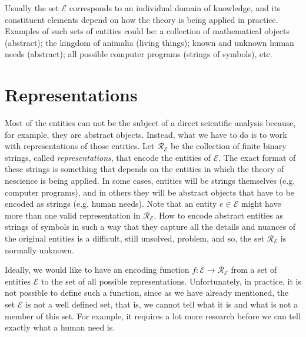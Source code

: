 Usually the set $\mathcal{E}$ corresponds to an individual domain of knowledge, and its constituent elements depend on how the theory is being applied in practice. Examples of such sets of entities could be: a collection of mathematical objects (abstract); the kingdom of animalia (living things); known and unknown human needs (abstract); all possible computer programs (strings of symbols), etc.

%
%

\section{Representations}

Most of the entities can not be the subject of a direct scientific analysis because, for example, they are abstract objects. Instead, what we have to do is to work with representations of those entities. Let $\mathcal{R_\mathcal{E}}$ be the collection of finite binary strings, called \emph{representations}, that encode the entities of $\mathcal{E}$. The exact format of these strings is something that depends on the entities in which the theory of nescience is being applied. In some cases, entities will be strings themselves (e.g. computer programs), and in others they will be abstract objects that have to be encoded as strings (e.g. human needs). Note that an entity $e \in \mathcal{E}$ might have more than one valid representation in $\mathcal{R_\mathcal{E}}$. How to encode abstract entities as strings of symbols in such a way that they capture all the details and nuances of the original entities is a difficult, still unsolved, problem, and so, the set $\mathcal{R_\mathcal{E}}$ is normally unknown. 

Ideally, we would like to have an encoding function $f:\mathcal{E} \rightarrow \mathcal{R_\mathcal{E}}$ from a set of entities $\mathcal{E}$ to the set of all possible representations. Unfortunately, in practice, it is not possible to define such a function, since as we have already mentioned, the set $\mathcal{E}$ is not a well defined set, that is, we cannot tell what it is and what is not a member of this set. For example, it requires a lot more research before we can tell exactly what a human need is.

